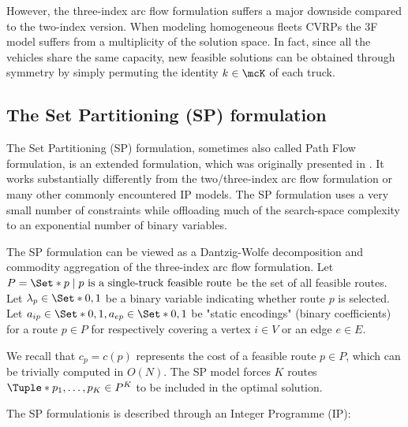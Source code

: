 However, the three-index arc flow formulation suffers a major downside compared to the two-index version.
When modeling homogeneous fleets CVRPs the 3F model suffers from a multiplicity of the solution space.
In fact, since all the vehicles share the same capacity,
new feasible solutions can be obtained through symmetry by simply permuting the identity $k \in \mcK$ of each truck.


\subsection{The Set Partitioning (SP) formulation}
\label{sec:intro-set-partition-formulation}

The Set Partitioning (SP) formulation, sometimes also called Path Flow formulation, is an extended formulation, which was originally presented in \textcite{balinski1964}.
It works substantially differently from the two/three-index arc flow formulation or many other commonly encountered IP models.
The SP formulation uses a very small number of constraints while offloading much of the search-space complexity to an exponential number of binary variables.


The SP formulation can be viewed as a Dantzig-Wolfe decomposition \parencite{dantzig1960}
and commodity aggregation \parencite{desaulniers1998}
of the three-index arc flow formulation.
Let $P = \Set*{p \mid p\ \text{is a single-truck feasible route}}$ be the set of all feasible routes.
Let $\lambda_p \in \Set*{0, 1}$ be a binary variable indicating whether route $p$ is selected.
Let $a_{ip} \in \Set*{0, 1}, a_{ep} \in \Set*{0, 1}$ be "static encodings" (binary coefficients)
for a route $p \in P$ for respectively covering a vertex $i \in V$ or an edge $e \in E$.

We recall that $c_p = c(p)$ represents the cost of a feasible route $p \in P$, which can be trivially computed in $O(N)$.
The SP model forces $K$ routes $\Tuple*{p_1, \dots, p_K} \in P^K$ to be included in the optimal solution.

The SP formulationis is described through an Integer Programme (IP):


